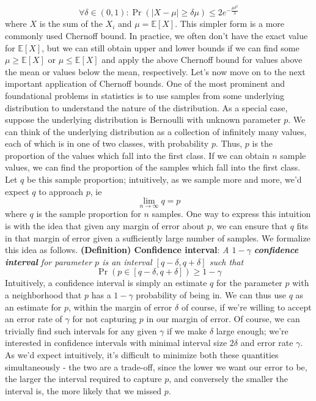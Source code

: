 \documentclass{article}
\newcommand*{\tb}{\textbf}
\newcommand*{\ti}{\textit}
\newcommand*{\nn}{\newline \newline}
\newcommand*{\E}{\mathbb{E}}
\begin{document}
$$ \forall \delta \in (0, 1): \Pr(| X - \mu | \geq \delta \mu) \leq 2 e^{- \frac{\mu \delta^2}{3}} $$
where $ X $ is the sum of the $ X_i $ and $ \mu = \E[X] $. This simpler form is a more commonly used Chernoff bound. In practice, we often don't have the exact value for $ \E[X] $, but we can still obtain upper and lower bounds if we can find some $ \mu \geq \E[X] $ or $ \mu \leq \E[X] $ and apply the above Chernoff bound for values above the mean or values below the mean, respectively.
\nn
Let's now move on to the next important application of Chernoff bounds. One of the most prominent and foundational problems in statistics is to use samples from some underlying distribution to understand the nature of the distribution. As a special case, suppose the underlying distribution is Bernoulli with unknown parameter $ p $. We can think of the underlying distribution as a collection of infinitely many values, each of which is in one of two classes, with probability $ p $. Thus, $ p $ is the proportion of the values which fall into the first class. If we can obtain $ n $ sample values, we can find the proportion of the samples which fall into the first class. Let $ q $ be this sample proportion; intuitively, as we sample more and more, we'd expect $ q $ to approach $ p $, ie
$$ \lim_{n \to \infty} q = p $$
where $ q $ is the sample proportion for $ n $ samples. One way to express this intuition is with the idea that given any margin of error about $ p $, we can ensure that $ q $ fits in that margin of error given a sufficiently large number of samples. We formalize this idea as follows.
\nn
\tb{(Definition) Confidence interval}: \ti{A $ 1 - \gamma $ \tb{confidence interval} for parameter $ p $ is an interval $ [q - \delta, q + \delta] $ such that}
$$ \Pr(p \in [q - \delta, q + \delta]) \geq 1 - \gamma $$
Intuitively, a confidence interval is simply an estimate $ q $ for the parameter $ p $ with a neighborhood that $ p $ has a $ 1 - \gamma $ probability of being in. We can thus use $ q $ as an estimate for $ p $, within the margin of error $ \delta $ of course, if we're willing to accept an error rate of $ \gamma $ for not capturing $ p $ in our margin of error. Of course, we can trivially find such intervals for any given $ \gamma $ if we make $ \delta $ large enough; we're interested in confidence intervals with minimal interval size $ 2 \delta $ and error rate $ \gamma $. As we'd expect intuitively, it's difficult to minimize both these quantities simultaneously - the two are a trade-off, since the lower we want our error to be, the larger the interval required to capture $ p $, and conversely the smaller the interval is, the more likely that we missed $ p $.
\end{document}
